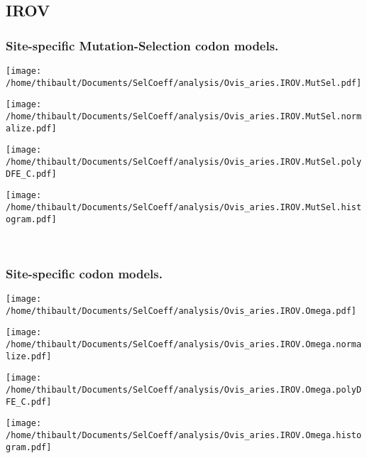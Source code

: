 \subsection{IROV} 
 
\subsubsection*{Site-specific Mutation-Selection codon models.} 
\begin{minipage}{0.49\linewidth} 
\texttt{[image: /home/thibault/Documents/SelCoeff/analysis/Ovis\_aries.IROV.MutSel.pdf]} 
\end{minipage}
\begin{minipage}{0.49\linewidth} 
\texttt{[image: /home/thibault/Documents/SelCoeff/analysis/Ovis\_aries.IROV.MutSel.normalize.pdf]} 
\end{minipage}
\begin{minipage}{0.49\linewidth} 
\texttt{[image: /home/thibault/Documents/SelCoeff/analysis/Ovis\_aries.IROV.MutSel.polyDFE\_C.pdf]} 
\end{minipage}
\begin{minipage}{0.49\linewidth} 
\texttt{[image: /home/thibault/Documents/SelCoeff/analysis/Ovis\_aries.IROV.MutSel.histogram.pdf]} 
\end{minipage}
\\ 
\subsubsection*{Site-specific codon models.} 
\begin{minipage}{0.49\linewidth} 
\texttt{[image: /home/thibault/Documents/SelCoeff/analysis/Ovis\_aries.IROV.Omega.pdf]} 
\end{minipage}
\begin{minipage}{0.49\linewidth} 
\texttt{[image: /home/thibault/Documents/SelCoeff/analysis/Ovis\_aries.IROV.Omega.normalize.pdf]} 
\end{minipage}
\begin{minipage}{0.49\linewidth} 
\texttt{[image: /home/thibault/Documents/SelCoeff/analysis/Ovis\_aries.IROV.Omega.polyDFE\_C.pdf]} 
\end{minipage}
\begin{minipage}{0.49\linewidth} 
\texttt{[image: /home/thibault/Documents/SelCoeff/analysis/Ovis\_aries.IROV.Omega.histogram.pdf]} 
\end{minipage}
\\ 
